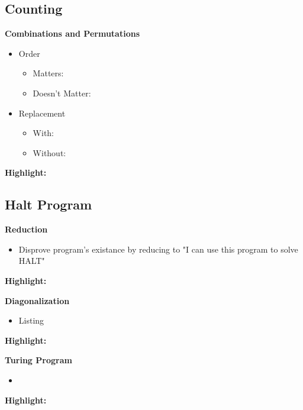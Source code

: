 \documentclass{article}\usepackage{amsmath,amssymb,amsthm,tikz,tkz-graph,color,chngpage,soul,hyperref,csquotes,graphicx,floatrow, listings,polynom}\newcommand*{\QEDB}{\hfill\ensuremath{\square}}\newtheorem*{prop}{Proposition}\renewcommand{\theenumi}{\alph{enumi}}\usepackage[shortlabels]{enumitem}\usepackage[nobreak=true]{mdframed}\usetikzlibrary{matrix,calc}\MakeOuterQuote{"}\usepackage[margin=0.75in]{geometry} \newtheorem{theorem}{Theorem}\newcommand{\Z}{\mathbb Z}\newcommand{\R}{\mathbb R}\newcommand{\Q}{\mathbb Q}\newcommand{\N}{\mathbb N}\newcommand{\x}[1]{\textrm{ #1 }}\newcommand{\pr}{\textrm{Pr}}
\begin{document}
\subsection*{Counting}
\textbf{Combinations and Permutations}
\begin{itemize}
    \item Order
    \begin{itemize}
        \item Matters:
        \item Doesn't Matter:
    \end{itemize}
    \item Replacement
    \begin{itemize}
        \item With:
        \item Without:
    \end{itemize}
\end{itemize}
\begin{mdframed}
\textbf{Highlight:}
\end{mdframed}

\subsection*{Halt Program}
\textbf{Reduction}
\begin{itemize}
    \item Disprove program's existance by reducing to "I can use this program to solve HALT"
\end{itemize}
\begin{mdframed}
\textbf{Highlight:}
\end{mdframed}
\textbf{Diagonalization}
\begin{itemize}
    \item Listing
\end{itemize}
\begin{mdframed}
\textbf{Highlight:}
\end{mdframed}
\textbf{Turing Program}
\begin{itemize}
    \item 
\end{itemize}
\begin{mdframed}
\textbf{Highlight:}
\end{mdframed}

\end{document}
